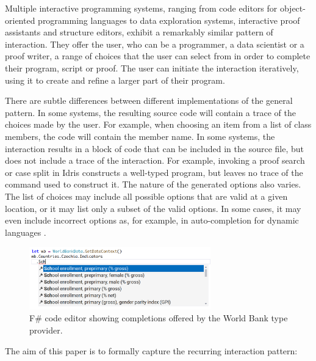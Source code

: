 \documentclass[ a4paper,UKenglish,cleveref, autoref, thm-restate]{lipics-v2021}
\begin{document}
Multiple interactive programming systems, ranging from code editors for object-oriented programming
languages to data exploration systems, interactive proof assistants and structure editors, exhibit a
remarkably similar pattern of interaction. They offer the user, who can be a programmer, a data scientist
or a proof writer, a range of choices that the user can select from in order to complete their
program, script or proof. The user can initiate the interaction iteratively, using it to
create and refine a larger part of their program.

There are subtle differences between different implementations of the general pattern. In some
systems, the resulting source code will contain a trace of the choices made by the user.
For example, when choosing an item from a list of class members, the code will contain the member
name. In some systems, the interaction results in a block of code that can be included in the
source file, but does not include a trace of the interaction. For example, invoking a proof search
or case split in Idris \cite{brady-2015-idris} constructs a well-typed program, but leaves no trace
of the command used to construct it.
%
The nature of the generated options also varies. The list of choices may include all possible
options that are valid at a given location, or it may list only a subset of the valid options.
In some cases, it may even include incorrect options as, for example, in auto-completion
for dynamic languages \cite{frolich-2024-autocomplete}.

\begin{figure}[t]
  \includegraphics[width=0.7\textwidth]{fig/worldbank.png}
  \caption{F\# code editor showing completions offered by the World Bank type provider.}
  \label{fig:worldbank}
\end{figure}

The aim of this paper is to formally capture the recurring interaction pattern:
\end{document}
